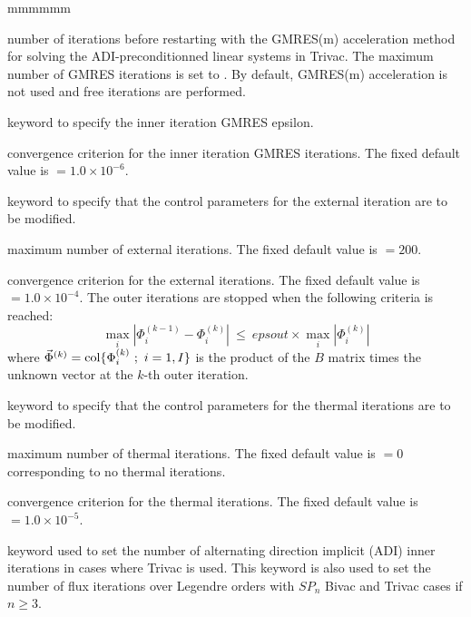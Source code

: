 \begin{ListeDeDescription}{mmmmmm}
\item[\dusa{nstard}] number of iterations before restarting with the GMRES(m) acceleration method for solving the ADI-preconditionned linear systems in Trivac. The maximum number of GMRES iterations is set to . By default, GMRES(m) acceleration is not used and  free iterations are performed.

\item[\moc{EPSG}] keyword to specify the inner iteration GMRES epsilon.

\item[\dusa{epsmsr}] convergence criterion for the inner iteration GMRES iterations. The
fixed default value is  $=1.0\times 10^{-6}$.

\item[\moc{EXTE}] keyword to specify that the control parameters for the
external iteration are to be modified. 

\item[\dusa{maxout}] maximum number of external iterations. The fixed default
value is  $=200$.

\item[\dusa{epsout}] convergence criterion for the external iterations. The
fixed default value is  $=1.0\times 10^{-4}$. The outer iterations are stopped when the following criteria is reached:
$$\max_i | \Phi_i^{(k-1)} - \Phi_i^{(k)} | \ \le \ epsout \times \max_i | \Phi_i^{(k)} |$$
\noindent where $\vec\Phi^{(k)}={\rm col}\{\Phi_i^{(k)} \ ; \ i=1,I\}$ is the product of the $B$ matrix times the unknown vector at the $k$-th outer iteration.

\item[\moc{THER}] keyword to specify that the control parameters for the
thermal iterations are to be modified.

\item[\dusa{maxthr}] maximum number of thermal iterations. The fixed default
value is  $=0$ corresponding to no thermal iterations.

\item[\dusa{epsthr}] convergence criterion for the thermal iterations. The
fixed default value is  $=1.0\times 10^{-5}$.

\item[\moc{ADI}] keyword used to set the number of alternating direction implicit (ADI) inner iterations in cases where Trivac is used.
This keyword is also used to set the number of flux iterations over Legendre orders with $SP_n$ Bivac and Trivac cases if $n\ge 3$.


\end{ListeDeDescription}
